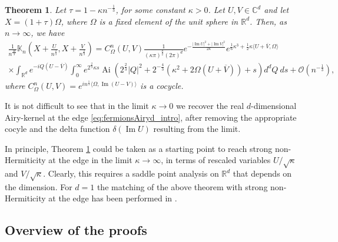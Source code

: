 \documentclass[%
 jmp,
cp,  %
 amsmath,amsthm,amssymb,%
 reprint,%
onecolumn]{revtex4-2}
\newtheorem{theorem}{Theorem}[section]
\renewcommand{\Im}{\operatorname{Im}}
\begin{document}
\begin{theorem} \label{thm:EGEdbulkWeakNonH_intro}
    Let $\tau = 1 - \kappa n^{-\frac{1}{3}}$, for some constant $\kappa>0$. Let $U,V\in\mathbb C^d$ and let $X = (1+\tau) \Omega$, where $\Omega$ is a fixed element of the unit sphere in $\mathbb R^d$. Then, as $n\to\infty$, we have 
    \begin{multline*}
    \frac{1}{n^\frac{4 d}{3}} \mathbb K_n\left(X+\frac{U}{n^\frac{2}{3}}, X+\frac{V}{n^\frac{2}{3}}\right)
    = 
    C_\Omega^n(U,V)
  \frac{1}{(\kappa\pi)^{\frac{d}{2}}(2\pi)^d}
   e^{-\frac{\lvert \operatorname{Im} U\rvert^2+\lvert \operatorname{Im} V\rvert^2}{2\kappa}}
e^{\frac{1}{6}\kappa^3+\frac{1}{2}\kappa \langle U+\overline V, \Omega\rangle}\\
    \times 
    \int_{\mathbb R^{d}} e^{-i Q(U-\overline V)}\int_0^\infty e^{2^{\frac23}\kappa s}
    \operatorname{Ai}\left(2^\frac{2}{3} \lvert Q\rvert^2 + 2^{-\frac{4}{3}} (\kappa^2 + 2 \Omega(U+\overline V)) +s\right)  d^{d}Q\ ds
    +\mathcal O(n^{-\frac{1}{3}}),
    \end{multline*}
    where $C_\Omega^n(U,V) = e^{i n^\frac{1}{3} \langle \Omega, \operatorname{Im}(U-V)\rangle}$ is a cocycle. 
    \end{theorem}
    
It is not difficult to see that in the limit $\kappa\to0$ we recover the real $d$-dimensional Airy-kernel at the edge \eqref{eq:fermionsAiryd_intro}, after removing the appropriate cocyle and the delta function $\delta(\Im U)$ resulting from the limit.

In principle, Theorem \ref{thm:EGEdbulkWeakNonH_intro} could be taken as a starting point to reach strong non-Hermiticity at the edge in the limit $\kappa\to\infty$, in terms of rescaled variables $U/\sqrt{\kappa}$ and $V/\sqrt{\kappa}$. Clearly, this requires a saddle point analysis on $\mathbb{R}^d$ that depends on the dimension. For $d=1$ the matching of the above theorem with strong non-Hermiticity at the edge has been performed in \cite{ABe}.

\subsection{Overview of the proofs}
\end{document}

